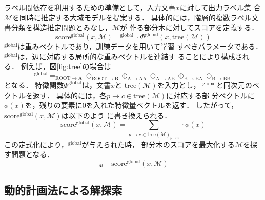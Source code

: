\documentclass[japanese]{jnlp_1.4}
\newcommand{\vect}[1]{}
\def\argmax{}
\begin{document}
ラベル間依存を利用するための準備として，入力文書$x$に対して出力ラベル集
合$\mathcal{M}$を同時に推定する大域モデルを提案する．
具体的には，階層的複数ラベル文書分類を構造推定問題とみなし，$\mathcal{M}$が
作る部分木に対してスコアを定義する．
\[
 \mathrm{score}^{\mathrm{global}}(x, \mathcal{M}) = \vect{w}^{\mathrm{global}} \cdot \Phi^{\mathrm{global}}(x, \mathrm{tree}(\mathcal{M}))
\]
$\vect{w}^{\mathrm{global}}$は重みベクトルであり，訓練データを用いて学習
すべきパラメータである．
$\vect{w}^{\mathrm{global}}$は，辺に対応する局所的な重みベクトルを連結す
ることにより構成される．
例えば，図\ref{fig:tree}の場合は
\[
 \vect{w}^{\mathrm{global}} =\vect{w}_{\mathrm{ROOT} \rightarrow \mathrm{A}}
 \oplus \vect{w}_{\mathrm{ROOT} \rightarrow \mathrm{B}}
\oplus \vect{w}_{\mathrm{A} \rightarrow \mathrm{AA}}
\oplus \vect{w}_{\mathrm{A} \rightarrow \mathrm{AB}}
\oplus \vect{w}_{\mathrm{B} \rightarrow \mathrm{BA}}
\oplus \vect{w}_{\mathrm{B} \rightarrow \mathrm{BB}} 
\]
となる．
特徴関数$\Phi^{\mathrm{global}}$は，文書$x$と
$\mathrm{tree}(\mathcal{M})$を入力とし，
$\vect{w}^{\mathrm{global}}$と同次元のベクトルを返す．
具体的には，各$p \rightarrow c \in \mathrm{tree}(\mathcal{M})$に対応する部
分ベクトルに$\phi(x)$を，残りの要素に$0$を入れた特徴量ベクトルを返す．
したがって，$\mathrm{score}^{\mathrm{global}}(x, \mathcal{M})$は以下のよう
に書き換えられる．
\[
 \mathrm{score}^{\mathrm{global}}(x, \mathcal{M})
  = \sum_{p \rightarrow c \in \mathrm{tree}(\mathcal{M})}
  \vect{w}_{p \rightarrow c} \cdot \phi(x)
\]
この定式化により，$\vect{w}^{\mathrm{global}}$が与えられた時，
部分木のスコアを最大化する$\mathcal{M}$を探す問題となる．
\[
 \argmax_{\mathcal{M}} \quad \mathrm{score}^{\mathrm{global}}(x, \mathcal{M})
\]


\subsection{動的計画法による解探索}
\end{document}
